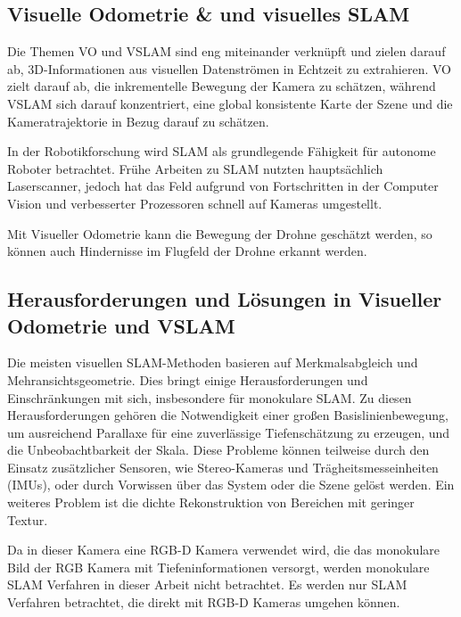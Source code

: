 \cite[vgl.][Kapitel 9.2 und Kapitel 7.8.1]{SWB-165930377X}



\subsection{Visuelle Odometrie \& und visuelles SLAM}

Die Themen \ac{VO} und \ac{VSLAM} sind eng miteinander verknüpft und zielen darauf ab, 3D-Informationen aus visuellen Datenströmen in Echtzeit zu extrahieren. \ac{VO} zielt darauf ab, die inkrementelle Bewegung der Kamera zu schätzen, während \ac{VSLAM} sich darauf konzentriert, eine global konsistente Karte der Szene und die Kameratrajektorie in Bezug darauf zu schätzen.

In der Robotikforschung wird \ac{SLAM} als grundlegende Fähigkeit für autonome Roboter betrachtet. Frühe Arbeiten zu \ac{SLAM} nutzten hauptsächlich Laserscanner, jedoch hat das Feld aufgrund von Fortschritten in der Computer Vision und verbesserter Prozessoren schnell auf Kameras umgestellt.

Mit Visueller Odometrie kann die Bewegung der Drohne geschätzt werden, so können auch Hindernisse im Flugfeld der Drohne erkannt werden.

\subsection{Herausforderungen und Lösungen in Visueller Odometrie und VSLAM}

Die meisten visuellen SLAM-Methoden basieren auf Merkmalsabgleich und Mehransichtsgeometrie. Dies bringt einige Herausforderungen und Einschränkungen mit sich, insbesondere für monokulare SLAM. Zu diesen Herausforderungen gehören die Notwendigkeit einer großen Basislinienbewegung, um ausreichend Parallaxe für eine zuverlässige Tiefenschätzung zu erzeugen, und die Unbeobachtbarkeit der Skala. Diese Probleme können teilweise durch den Einsatz zusätzlicher Sensoren, wie Stereo-Kameras und Trägheitsmesseinheiten (\ac{IMU}s), oder durch Vorwissen über das System oder die Szene gelöst werden. Ein weiteres Problem ist die dichte Rekonstruktion von Bereichen mit geringer Textur.

Da in dieser Kamera eine RGB-D Kamera verwendet wird, die das monokulare Bild der RGB Kamera mit Tiefeninformationen versorgt, werden monokulare \ac{SLAM} Verfahren in dieser Arbeit nicht betrachtet. Es werden nur \ac{SLAM} Verfahren betrachtet, die direkt mit \ac{RGB-D} Kameras umgehen können.

